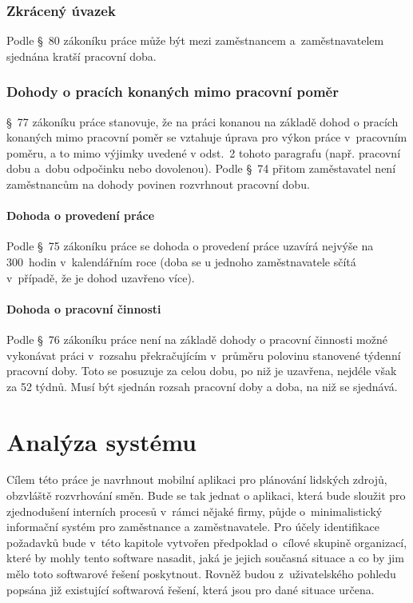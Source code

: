 \documentclass[twoside]{ctuthesis}
\begin{document}
\subsection{Zkrácený úvazek}
Podle §~80 zákoníku práce může být mezi zaměstnancem a~zaměstnavatelem sjednána kratší pracovní doba.

\subsection{Dohody o pracích konaných mimo pracovní poměr}
§~77 zákoníku práce stanovuje, že na práci konanou na základě dohod o pracích konaných mimo pracovní poměr se vztahuje úprava pro výkon práce v~pracovním poměru, a to mimo výjimky uvedené v odst.~2 tohoto paragrafu (např. pracovní dobu a~dobu odpočinku nebo dovolenou). Podle §~74 přitom zaměstavatel není zaměstnancům na dohody povinen rozvrhnout pracovní dobu.

\subsubsection{Dohoda o provedení práce}
Podle §~75 zákoníku práce se dohoda o provedení práce uzavírá nejvýše na 300~hodin v~kalendářním roce (doba se u jednoho zaměstnavatele sčítá v~případě, že je dohod uzavřeno více).

\subsubsection{Dohoda o pracovní činnosti}
Podle §~76 zákoníku práce není na základě dohody o pracovní činnosti možné vykonávat práci v~rozsahu překračujícím v~průměru polovinu stanovené týdenní pracovní doby. Toto se posuzuje za celou dobu, po niž je uzavřena, nejdéle však za 52 týdnů. Musí být sjednán rozsah pracovní doby a doba, na niž se sjednává.


\chapter{Analýza systému}

Cílem této práce je navrhnout mobilní aplikaci pro plánování lidských zdrojů, obzvláště rozvrhování směn. Bude se tak jednat o aplikaci, která bude sloužit pro zjednodušení interních procesů v~rámci nějaké firmy, půjde o~minimalistický informační systém pro zaměstnance a zaměstnavatele. Pro účely identifikace požadavků bude v~této kapitole vytvořen předpoklad o~cílové skupině organizací, které by mohly tento software nasadit, jaká je jejich současná situace a co by jim mělo toto softwarové řešení poskytnout. Rovněž budou z~uživatelského pohledu popsána již existující softwarová řešení, která jsou pro dané situace určena.
\end{document}
